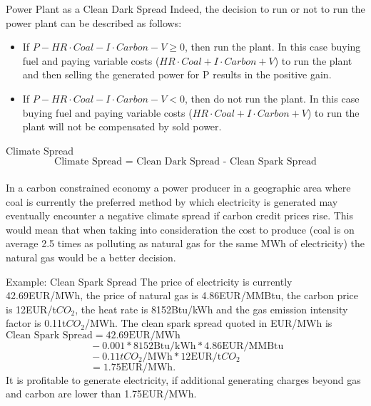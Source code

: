 {Power Plant as a Clean Dark Spread}
Indeed, the decision to run or not to run the power plant can be described as follows:
\begin{itemize}
  \item If $P-HR\cdot Coal - I\cdot Carbon - V\geq0$, then run the plant. In this case buying fuel and paying variable costs ($HR\cdot Coal + I\cdot Carbon + V$) to run the plant and then selling the generated power for P results in the positive gain.
  \item If $P-HR\cdot Coal - I\cdot Carbon - V<0$, then do not run the plant. In this case buying fuel and paying variable costs ($HR\cdot Coal + I\cdot Carbon + V$) to run the plant will not be compensated by sold power.
\end{itemize}




{Climate Spread}
$$\text{Climate Spread = Clean Dark Spread - Clean Spark Spread}$$\\
  \vspace{0.6cm}
In a carbon constrained economy a power producer in a geographic area where coal is currently the preferred method by which electricity is generated may eventually encounter a negative climate spread  if carbon credit prices rise. This would mean that when taking into consideration the cost to produce (coal is on average 2.5 times as polluting as natural gas for the same MWh of electricity) the natural gas would be a better decision.




{Example: Clean Spark Spread}
The price of electricity is currently 42.69EUR/MWh, the price of natural gas is 4.86EUR/MMBtu, the carbon price is 12EUR/t$CO_2$, the heat rate is 8152Btu/kWh and the gas emission intensity factor is 0.11t$CO_2$/MWh. The clean spark spread quoted in EUR/MWh is\\
$\text{Clean Spark Spread}=42.69\text{EUR/MWh}$\\
$\qquad\qquad\qquad\qquad\;\,-0.001\ast8152\text{Btu/kWh}\ast4.86\text{EUR/MMBtu}$\\
$\qquad\qquad\qquad\qquad\;\,-0.11tCO_2\text{/MWh}\ast12\text{EUR/t}CO_2$\\
$\qquad\qquad\qquad\qquad\;\,=1.75\text{EUR/MWh}.$\\
\vspace{0.2cm}
It is profitable to generate electricity, if additional generating charges beyond gas and carbon are lower than 1.75EUR/MWh.




